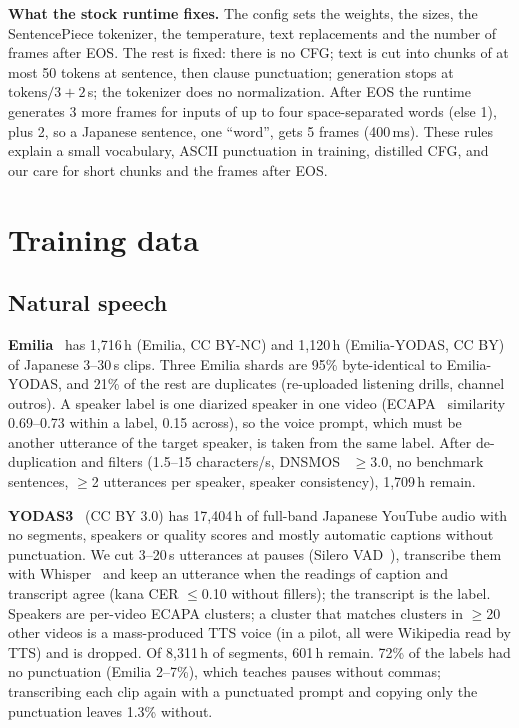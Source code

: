 \documentclass[10pt,a4paper,twocolumn]{article}
\begin{document}
\textbf{What the stock runtime fixes.} The config sets the weights, the sizes, the SentencePiece
tokenizer, the temperature, text replacements and the number of frames after EOS. The rest is
fixed: there is no CFG; text is cut into chunks of at most 50 tokens at sentence, then clause
punctuation; generation stops at $\text{tokens}/3+2$\,s; the tokenizer does no normalization. After
EOS the runtime generates 3 more frames for inputs of up to four space-separated words (else 1),
plus 2, so a Japanese sentence, one ``word'', gets 5 frames (400\,ms). These rules explain a small
vocabulary, ASCII punctuation in training, distilled CFG, and our care for short chunks and the
frames after EOS.

\section{Training data}\label{sec:data}
\subsection{Natural speech}
\textbf{Emilia}~\cite{emilia,emilialarge} has 1,716\,h (Emilia, CC BY-NC) and 1,120\,h (Emilia-YODAS,
CC BY) of Japanese 3--30\,s clips. Three Emilia shards are 95\% byte-identical to Emilia-YODAS, and
21\% of the rest are duplicates (re-uploaded listening drills, channel outros). A speaker label is one
diarized speaker in one video (ECAPA~\cite{ecapa} similarity 0.69--0.73 within a label, 0.15 across),
so the voice prompt, which must be another utterance of the target speaker, is taken from the same
label. After de-duplication and filters (1.5--15 characters/s, DNSMOS~\cite{dnsmos} $\ge$3.0, no
benchmark sentences, $\ge$2 utterances per speaker, speaker consistency), 1,709\,h remain.

\textbf{YODAS3}~\cite{yodas,yodas3} (CC BY 3.0) has 17,404\,h of full-band Japanese YouTube audio with
no segments, speakers or quality scores and mostly automatic captions without punctuation. We cut
3--20\,s utterances at pauses (Silero VAD~\cite{silero}), transcribe them with Whisper~\cite{whisper}
and keep an utterance when the readings of caption and transcript agree (kana CER $\le$0.10 without
fillers); the transcript is the label. Speakers are per-video ECAPA clusters; a cluster that matches
clusters in $\ge$20 other videos is a mass-produced TTS voice (in a pilot, all were Wikipedia read by
TTS) and is dropped. Of 8,311\,h of segments, 601\,h remain. 72\% of the labels had no punctuation
(Emilia 2--7\%), which teaches pauses without commas; transcribing each clip again with a punctuated
prompt and copying only the punctuation leaves 1.3\% without.
\end{document}
